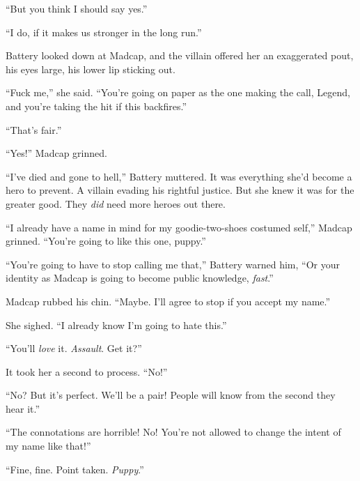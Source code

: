 ``But you think I should say yes.''



``I do, if it makes us stronger in the long run.''



Battery looked down at Madcap, and the villain offered her an exaggerated pout, his eyes large, his lower lip sticking out.



``Fuck me,'' she said.  ``You're going on paper as the one making the call, Legend, and you're taking the hit if this backfires.''



``That's fair.''



``Yes!'' Madcap grinned.



``I've died and gone to hell,'' Battery muttered.  It was everything she'd become a hero to prevent.  A villain evading his rightful justice.  But she knew it was for the greater good.  They \emph{did} need more heroes out there.



``I already have a name in mind for my goodie-two-shoes costumed self,'' Madcap grinned.  ``You're going to like this one, puppy.''



``You're going to have to stop calling me that,'' Battery warned him, ``Or your identity as Madcap is going to become public knowledge, \emph{fast}.''



Madcap rubbed his chin.  ``Maybe.  I'll agree to stop if you accept my name.''



She sighed.  ``I already know I'm going to hate this.''



``You'll \emph{love} it.  \emph{Assault}.  Get it?''



It took her a second to process.  ``No!''



``No?  But it's perfect.  We'll be a pair!  People will know from the second they hear it.''



``The connotations are horrible!  No!  You're not allowed to change the intent of my name like that!''



``Fine, fine.  Point taken.  \emph{Puppy}.''




